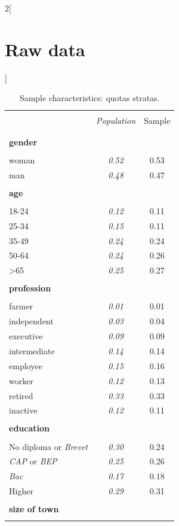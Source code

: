 \documentclass[11pt]{article}
\renewcommand{\arraystretch}{0.73}
\begin{document}
\newpage
\begin{appendices}


\begin{multicols}{2}[\section{Raw data\label{sec:Raw-Data}}]

\renewcommand{\arraystretch}{0.58}

\begin{table}[H]
\label{table:sample_characteristics}
\caption{\label{tab:Sample-Characteristics}Sample characteristics: quotas stratas.}
\centering
\begin{tabular}{lcc}
\hline \hline  \\[-1.8ex]
 & \emph{Population} & Sample  \tabularnewline \\[-1.8ex]
\hline  \\[-1.8ex]
\textbf{gender} & & \tabularnewline  \\[-1.8ex]
woman & \emph{0.52} & 0.53\tabularnewline
man & \emph{0.48} & 0.47\tabularnewline
\hline \\[-1.8ex]
\textbf{age} &  & \tabularnewline  \\[-1.8ex]
18-24 & \emph{0.12} & 0.11\tabularnewline
25-34 & \emph{0.15} & 0.11\tabularnewline
35-49 & \emph{0.24} & 0.24\tabularnewline
50-64 & \emph{0.24} & 0.26\tabularnewline
>65 & \emph{0.25} & 0.27\tabularnewline
\hline \\[-1.8ex]
\textbf{profession} &  & \tabularnewline  \\[-1.8ex]
farmer & \emph{0.01} & 0.01\tabularnewline
independent & \emph{0.03} & 0.04\tabularnewline
executive & \emph{0.09} & 0.09\tabularnewline
intermediate & \emph{0.14} & 0.14\tabularnewline
employee & \emph{0.15} & 0.16\tabularnewline
worker & \emph{0.12} & 0.13\tabularnewline
retired & \emph{0.33} & 0.33\tabularnewline
inactive & \emph{0.12} & 0.11\tabularnewline
\hline  \\[-1.8ex]
\textbf{education} &  & \tabularnewline  \\[-1.8ex]
No diploma or \emph{Brevet} & \emph{0.30} & 0.24\tabularnewline
\emph{CAP} or \emph{BEP} & \emph{0.25} & 0.26\tabularnewline
\emph{Bac} & \emph{0.17} & 0.18\tabularnewline
Higher & \emph{0.29} & 0.31\tabularnewline
\hline  \\[-1.8ex]
\textbf{size of town} &  & \tabularnewline  \\[-1.8ex]

\end{tabular}
\end{table}
\end{multicols}
\end{appendices}
\end{document}
